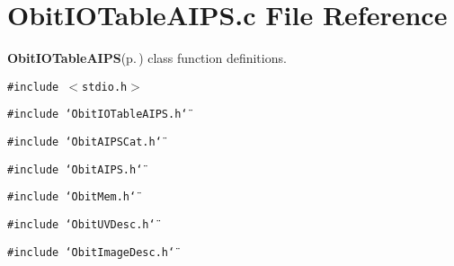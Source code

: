 \section{Obit\-IOTable\-AIPS.c File Reference}
\label{ObitIOTableAIPS_8c}
{\bf Obit\-IOTable\-AIPS}{\rm (p.\,\pageref{structObitIOTableAIPS})} class function definitions. 

{\tt \#include $<$stdio.h$>$}\par
{\tt \#include \char`\"{}Obit\-IOTable\-AIPS.h\char`\"{}}\par
{\tt \#include \char`\"{}Obit\-AIPSCat.h\char`\"{}}\par
{\tt \#include \char`\"{}Obit\-AIPS.h\char`\"{}}\par
{\tt \#include \char`\"{}Obit\-Mem.h\char`\"{}}\par
{\tt \#include \char`\"{}Obit\-UVDesc.h\char`\"{}}\par
{\tt \#include \char`\"{}Obit\-Image\-Desc.h\char`\"{}}\par
